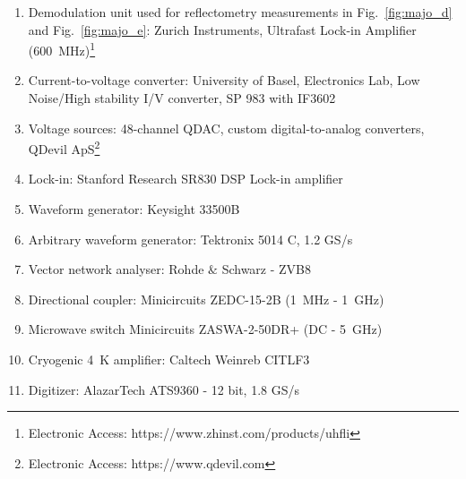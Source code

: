 \begin{enumerate}
\item Demodulation unit used for reflectometry measurements in Fig.~\ref{fig:majo_d} and Fig.~\ref{fig:majo_e}: Zurich Instruments, Ultrafast Lock-in Amplifier (\SI{600}{\mega\hertz})\footnote{Electronic Access: https://www.zhinst.com/products/uhfli}

\item Current-to-voltage converter: University of Basel, Electronics Lab, Low Noise/High stability I/V converter, SP 983 with IF3602

\item Voltage sources: 48-channel QDAC, custom digital-to-analog converters, QDevil ApS\footnote{Electronic Access: https://www.qdevil.com}

\item Lock-in: Stanford Research SR830 DSP Lock-in amplifier

\item Waveform generator: Keysight 33500B

\item Arbitrary waveform generator: Tektronix 5014 C, 1.2 GS/s

\item Vector network analyser: Rohde $\&$ Schwarz - ZVB8

\item Directional coupler: Minicircuits ZEDC-15-2B (\SI{1}{\mega\hertz} - \SI{1}{\giga\hertz})

\item Microwave switch Minicircuits ZASWA-2-50DR+ (DC - \SI{5}{\giga\hertz})

\item Cryogenic \SI{4}{\kelvin} amplifier: Caltech Weinreb CITLF3

\item Digitizer: AlazarTech ATS9360 - 12 bit, 1.8 GS/s
\end{enumerate}

